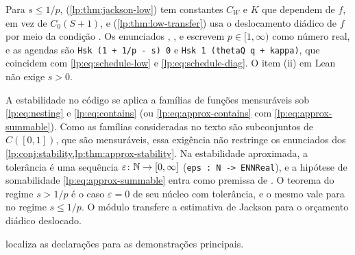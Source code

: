 \documentclass[12pt,a4paper]{article}
\begin{document}
Para $s\le1/p$,  (\cref{lp:thm:jackson-low}) tem constantes $C_W$ e $K$ que dependem de $f$, em vez de $C_0(S+1)$, e  (\cref{lp:thm:low-transfer}) usa o deslocamento diádico de $f$ por meio da condição . Os enunciados , ,  e  escrevem $p\in[1,\infty)$ como número real, e as agendas são \texttt{Hsk (1 + 1/p - s) 0} e \texttt{Hsk 1 (thetaQ q + kappa)}, que coincidem com \eqref{lp:eq:schedule-low} e \eqref{lp:eq:schedule-diag}. O item (ii) em Lean não exige $s>0$.

A estabilidade no código se aplica a famílias de funções mensuráveis sob \eqref{lp:eq:nesting} e \eqref{lp:eq:contains} (ou \eqref{lp:eq:approx-contains} com \eqref{lp:eq:approx-summable}). Como as famílias consideradas no texto são subconjuntos de $C([0,1])$, que são mensuráveis, essa exigência não restringe os enunciados dos \cref{lp:conj:stability,lp:thm:approx-stability}. Na estabilidade aproximada, a tolerância é uma sequência $\varepsilon\colon\mathbb N\to[0,\infty]$ (\texttt{eps : N -> ENNReal}), e a hipótese de somabilidade \eqref{lp:eq:approx-summable} entra como premissa de . O teorema  do regime $s>1/p$ é o caso $\varepsilon=0$ de seu núcleo com tolerância, e o mesmo vale para  no regime $s\le1/p$. O módulo  transfere a estimativa de Jackson para o orçamento diádico deslocado.

 localiza as declarações para as demonstrações principais.
\end{document}
